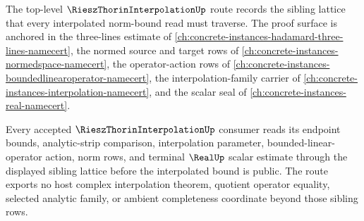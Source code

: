 The top-level $\RieszThorinInterpolationUp$ route records the sibling lattice that every interpolated norm-bound read must traverse. The proof surface is anchored in the three-lines estimate of \autoref{ch:concrete-instances-hadamard-three-lines-namecert}, the normed source and target rows of \autoref{ch:concrete-instances-normedspace-namecert}, the operator-action rows of \autoref{ch:concrete-instances-boundedlinearoperator-namecert}, the interpolation-family carrier of \autoref{ch:concrete-instances-interpolation-namecert}, and the scalar seal of \autoref{ch:concrete-instances-real-namecert}.

\begin{lemma}
Every accepted $\RieszThorinInterpolationUp$ consumer reads its endpoint bounds, analytic-strip comparison, interpolation parameter, bounded-linear-operator action, norm rows, and terminal $\RealUp$ scalar estimate through the displayed sibling lattice before the interpolated bound is public. The route exports no host complex interpolation theorem, quotient operator equality, selected analytic family, or ambient completeness coordinate beyond those sibling rows.
\end{lemma}
